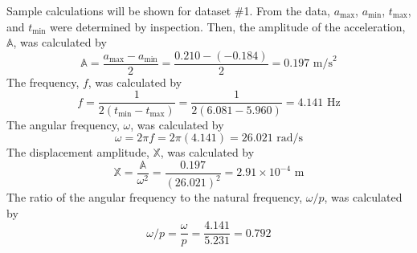Sample calculations will be shown for dataset \#1. From the data, $a_{\text{max}}$, $a_{\text{min}}$, $t_{\text{max}}$, and $t_{\text{min}}$ were determined by inspection. Then, the amplitude of the acceleration, $\mathbb{A}$, was calculated by
\begin{equation*}
    \mathbb{A} = \frac{a_{\text{max}} - a_{\text{min}}}{2} = \frac{0.210 - (-0.184)}{2} = 0.197 \text{ m/s}^2
\end{equation*}
The frequency, $f$, was calculated by
\begin{equation*}
    f = \frac{1}{2(t_{\text{min}} - t_{\text{max}})} = \frac{1}{2(6.081 - 5.960)} = 4.141 \text{ Hz}
\end{equation*}
The angular frequency, $\omega$, was calculated by
\begin{equation*}
    \omega = 2\pi f = 2\pi(4.141) = 26.021 \text{ rad/s}
\end{equation*}
The displacement amplitude, $\mathbb{X}$, was calculated by
\begin{equation*}
    \mathbb{X} = \frac{\mathbb{A}}{\omega^2} = \frac{0.197}{(26.021)^2} = 2.91 \times 10^{-4} \text{ m}
\end{equation*}
The ratio of the angular frequency to the natural frequency, $\omega/p$, was calculated by
\begin{equation*}
    \omega/p = \frac{\omega}{p} = \frac{4.141}{5.231} = 0.792
\end{equation*}